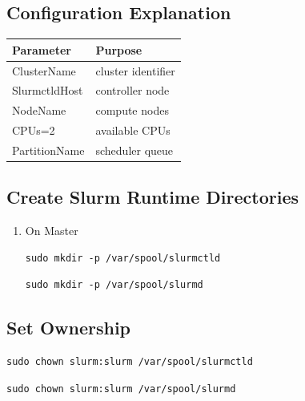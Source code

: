 \documentclass[11pt]{article}
\begin{document}
\subsection{Configuration Explanation}
\label{sec:org8f9315f}

\begin{center}
\begin{tabular}{ll}
Parameter & Purpose\\
\hline
ClusterName & cluster identifier\\
SlurmctldHost & controller node\\
NodeName & compute nodes\\
CPUs=2 & available CPUs\\
PartitionName & scheduler queue\\
\end{tabular}
\end{center}
\subsection{Create Slurm Runtime Directories}
\label{sec:org8091a8b}
\begin{enumerate}
\item On Master
\label{sec:org2a60bcd}

\begin{verbatim}
sudo mkdir -p /var/spool/slurmctld
\end{verbatim}

\begin{verbatim}
sudo mkdir -p /var/spool/slurmd
\end{verbatim}
\end{enumerate}
\subsection{Set Ownership}
\label{sec:org2c1576f}

\begin{verbatim}
sudo chown slurm:slurm /var/spool/slurmctld
\end{verbatim}

\begin{verbatim}
sudo chown slurm:slurm /var/spool/slurmd
\end{verbatim}
\end{document}
